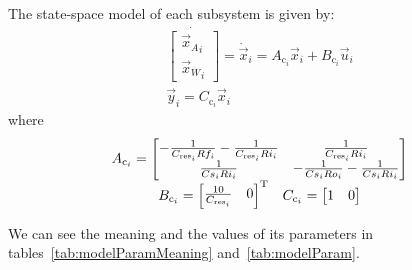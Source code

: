 \documentclass[a4paper, 10 pt, conference]{ieeeconf}  %
\begin{document}
The state-space model of each subsystem is given by:
\begin{equation}
\begin{matrix}
  \dot{\left[\begin{matrix} {\vec{x}_{A}}_{i}\\ {\vec{x}_{W}}_{i} \end{matrix} \right]}
  =\dot{\vec{x}}_{i}=A_{\mathrm{c}_{i}}\vec{x}_{i}+B_{\mathrm{c}_{i}}\vec{u}_{i}\\
\vec{y}_{i}=C_{\mathrm{c}_{i}}\vec{x}_{i}
\end{matrix}
\end{equation}
where
\begin{equation}
  \label{eq:4}
  \begin{matrix}
  A_{\mathrm{c}_{i}}=\left[
    \begin{matrix}
      -\frac{1}{C_{\mathrm{res}_{i}}Rf_{i}}-\frac{1}{C_{\mathrm{res}_{i}}Ri_{i}}& \frac{1}{C_{\mathrm{res}_{i}}Ri_{i}}\\
      \frac{1}{Cs_{i}Ri_{i}} &-\frac{1}{Cs_{i}Ro_{i}}-\frac{1}{Cs_{i}Ri_{i}}
    \end{matrix}\right]\\
  \begin{matrix}
    B_{\mathrm{c}_{i}}=\left[
      \begin{matrix}  \frac{10}{C_{\mathrm{res}_{i}}}& 0\end{matrix}
    \right]^{\mathrm{T}}&C_{\mathrm{c}_{i}}=\left[\begin{matrix}1 & 0\end{matrix}\right]
  \end{matrix}
  \end{matrix}
\end{equation}

We can see the meaning and the values of its parameters in tables~\ref{tab:modelParamMeaning} and~\ref{tab:modelParam}.
\end{document}
